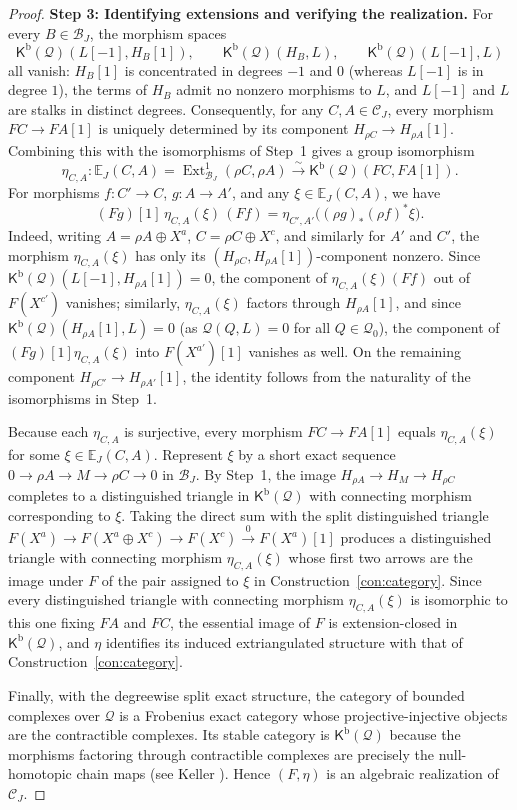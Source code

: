 \documentclass[a4paper,reqno,10pt]{amsart}
\numberwithin{equation}{section}
\theoremstyle{definition}
\newcommand{\B}{\mathcal B}
\newcommand{\C}{\mathcal C}
\newcommand{\E}{\mathbb E}
\newcommand{\Q}{\mathcal Q}
\newcommand{\Kb}{\mathsf K^{\mathrm b}}
\DeclareMathOperator{\Ext}{Ext}
\begin{document}
\begin{proof}
\medskip\noindent\textbf{Step 3: Identifying extensions and verifying the realization.}
For every $B\in\B_J$, the morphism spaces
\[
 \Kb(\Q)(L[-1],H_B[1]),\qquad
 \Kb(\Q)(H_B,L),\qquad
 \Kb(\Q)(L[-1],L)
\]
all vanish: $H_B[1]$ is concentrated in degrees $-1$ and $0$ (whereas $L[-1]$
is in degree $1$), the terms of $H_B$ admit no nonzero morphisms to $L$, and
$L[-1]$ and $L$ are stalks in distinct degrees. Consequently, for any
$C,A\in\C_J$, every morphism $FC\to FA[1]$ is uniquely determined by its
component $H_{\rho C}\to H_{\rho A}[1]$. Combining this with the isomorphisms of
Step~1 gives a group isomorphism
\[
 \eta_{C,A}:\E_J(C,A)=\Ext^1_{\B_J}(\rho C,\rho A)
      \xrightarrow{\ \sim\ }\Kb(\Q)(FC,FA[1]).
\]
For morphisms $f:C'\to C$, $g:A\to A'$, and any $\xi\in\E_J(C,A)$, we have
\[
 (Fg)[1]\,\eta_{C,A}(\xi)\,(Ff)
     =\eta_{C',A'}\bigl((\rho g)_*(\rho f)^*\xi\bigr).
\]
Indeed, writing $A=\rho A\oplus X^a$, $C=\rho C\oplus X^c$, and similarly for
$A'$ and $C'$, the morphism $\eta_{C,A}(\xi)$ has only its
$(H_{\rho C},H_{\rho A}[1])$-component nonzero. Since
$\Kb(\Q)(L[-1],H_{\rho A}[1])=0$, the component of $\eta_{C,A}(\xi)(Ff)$ out of
$F(X^{c'})$ vanishes; similarly, $\eta_{C,A}(\xi)$ factors through
$H_{\rho A}[1]$, and since $\Kb(\Q)(H_{\rho A}[1],L)=0$ (as $\Q(Q,L)=0$ for all
$Q\in\Q_0$), the component of $(Fg)[1]\eta_{C,A}(\xi)$ into $F(X^{a'})[1]$
vanishes as well. On the remaining component $H_{\rho C'}\to H_{\rho A'}[1]$,
the identity follows from the naturality of the isomorphisms in Step~1.

Because each $\eta_{C,A}$ is surjective, every morphism $FC\to FA[1]$ equals
$\eta_{C,A}(\xi)$ for some $\xi\in\E_J(C,A)$. Represent $\xi$ by a short exact
sequence $0\to\rho A\to M\to\rho C\to0$ in $\B_J$. By Step~1, the image
$H_{\rho A}\to H_M\to H_{\rho C}$ completes to a distinguished triangle in
$\Kb(\Q)$ with connecting morphism corresponding to $\xi$. Taking the direct
sum with the split distinguished triangle
$F(X^a)\to F(X^a\oplus X^c)\to F(X^c)\xrightarrow{0}F(X^a)[1]$ produces a
distinguished triangle with connecting morphism $\eta_{C,A}(\xi)$ whose first
two arrows are the image under $F$ of the pair assigned to $\xi$ in
Construction~\ref{con:category}. Since every distinguished triangle with
connecting morphism $\eta_{C,A}(\xi)$ is isomorphic to this one fixing $FA$ and
$FC$, the essential image of $F$ is extension-closed in $\Kb(\Q)$, and $\eta$
identifies its induced extriangulated structure \cite[Remark~2.18]{NP} with
that of Construction~\ref{con:category}.

Finally, with the degreewise split exact structure, the category of bounded
complexes over $\Q$ is a Frobenius exact category whose projective-injective
objects are the contractible complexes. Its stable category is $\Kb(\Q)$
because the morphisms factoring through contractible complexes are precisely
the null-homotopic chain maps (see Keller \cite[\S2.3]{Ke}). Hence $(F,\eta)$
is an algebraic realization of $\C_J$.
\end{proof}
\end{document}
